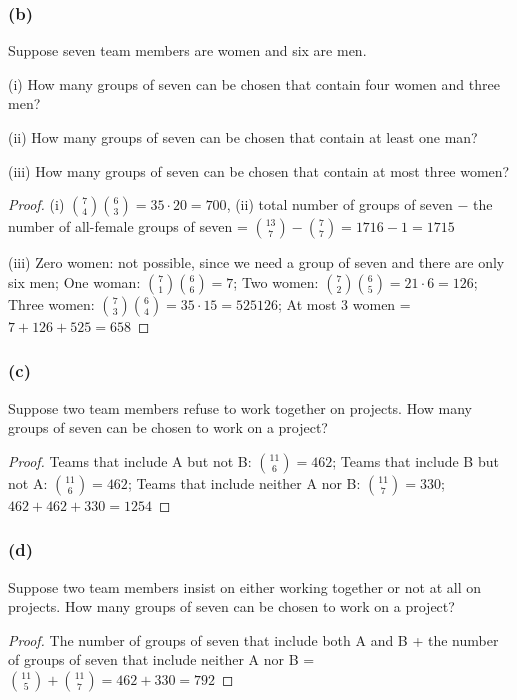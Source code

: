 \documentclass[14pt]{extarticle}
\begin{document}
\subsubsection{(b)}
Suppose seven team members are women and six are men.

(i) How many groups of seven can be chosen that contain four women and three men?

(ii) How many groups of seven can be chosen that contain at least one man?

(iii) How many groups of seven can be chosen that contain at most three women?

\begin{proof}
(i) \(\binom{7}{4}\binom{6}{3} = 35 \cdot 20 = 700\), (ii) total number of groups of seven \(-\) the number of all-female 
groups of seven = \(\binom{13}{7} - \binom{7}{7} = 1716 - 1 = 1715\)

(iii) Zero women: not possible, since we need a group of seven and there are only six men; One woman: \(\binom{7}{1}
\binom{6}{6} = 7\); Two women: \(\binom{7}{2}\binom{6}{5} = 21 \cdot 6 = 126\); Three women: \(\binom{7}{3}\binom{6}{4} 
= 35 \cdot 15 = 525 126\); At most 3 women = \(7 + 126 + 525 = 658\)
\end{proof}

\subsubsection{(c)}
Suppose two team members refuse to work together on projects. How many groups of seven can be chosen to work on 
a project?

\begin{proof}
Teams that include A but not B: \(\binom{11}{6} = 462\);
Teams that include B but not A: \(\binom{11}{6} = 462\);
Teams that include neither A nor B: \(\binom{11}{7}=330\);
\(462+462+330 = 1254\)
\end{proof}

\subsubsection{(d)}
Suppose two team members insist on either working together or not at all on projects. How many groups of seven can be 
chosen to work on a project?

\begin{proof}
The number of groups of seven that include both A and B + the number of groups of seven that include neither A nor B
= \(\binom{11}{5} + \binom{11}{7} = 462 + 330 = 792\)
\end{proof}
\end{document}
